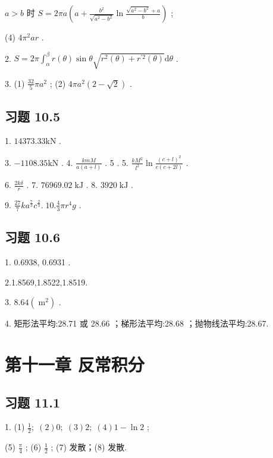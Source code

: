 \(a > b\) 时 \(S = {2\pi a}\left( {a + \frac{{b}^{2}}{\sqrt{{a}^{2} - {b}^{2}}}\ln \frac{\sqrt{{a}^{2} - {b}^{2}} + a}{b}}\right)\) ;

(4) \(4{\pi }^{2}{ar}\) .

2. \(S = {2\pi }{\int }_{\alpha }^{\beta }r\left( \theta \right) \sin \theta \sqrt{{r}^{2}\left( \theta \right)  + {r}^{\prime 2}\left( \theta \right) }\mathrm{d}\theta\) .

3. (1) \(\frac{32}{5}\pi {a}^{2}\) ; (2) \({4\pi }{a}^{2}\left( {2 - \sqrt{2}}\right)\) .

\subsection{习题 10.5}

1. \({14373.33}\mathrm{{kN}}\) .

3. \(- {1108.35}\mathrm{{kN}}\) . 4. \(\frac{kmM}{a\left( {a + l}\right) }\) . 5 . 5. \(\frac{k{M}^{2}}{{l}^{2}}\ln \frac{{\left( c + l\right) }^{2}}{c\left( {c + {2l}}\right) }\) .

6. \(\frac{2k\delta }{r}\) . 7. \({76969.02}\mathrm{\;{kJ}}\) . 8. \({3920}\mathrm{\;{kJ}}\) .

9. \(\frac{27}{7}k{a}^{\frac{7}{3}}{c}^{\frac{2}{3}}.\;{10}.\frac{4}{3}\pi {r}^{4}g\) .

\subsection{习题 10.6}

1. 0.6938, 0.6931 .

2.1.8569,1.8522,1.8519.

3. \({8.64}\left( {\mathrm{\;m}}^{2}\right)\) .

4. 矩形法平均:28.71 或 28.66 ；梯形法平均:28.68 ；抛物线法平均:28.67.

\section{第十一章 反常积分}

\subsection{习题 11.1}

1. (1) \(\frac{1}{2};\;\left( 2\right) 0;\;\left( 3\right) 2;\;\left( 4\right) 1 - \ln 2\) ;

(5) \(\frac{\pi }{4}\) ; (6) \(\frac{1}{2}\) ; (7) 发散；(8) 发散.

